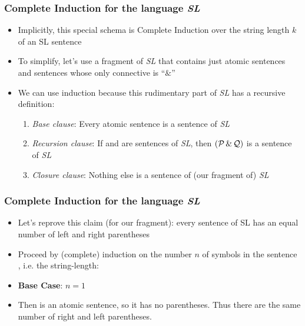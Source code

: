 \begin{frame}
\frametitle{Complete Induction for the language {\it{SL}}}

\begin{itemize}[<+->]
\item Implicitly, this special schema is Complete Induction over the string length $k$ of an SL sentence

\item To simplify, let's use a fragment of {\it{SL}} that contains just atomic sentences and sentences whose only connective is ``$\&$''

\item We can use induction because this rudimentary part of {\it{SL}} has a recursive definition:

\begin{enumerate}
\item {\emph{Base clause}}: Every atomic sentence is a sentence of {\it{SL}}

\item {\emph{Recursion clause}}: If  and  are sentences of {\it{SL}}, then $(\mathcal{P} \,\&\, \mathcal{Q})$ is a sentence of {\it{SL}}

\item {\emph{Closure clause}}: Nothing else is a sentence of (our fragment of) {\it{SL}}
\end{enumerate}

\end{itemize} 
\end{frame}

\begin{frame}
\frametitle{Complete Induction for the language {\it{SL}}}

\begin{itemize}[<+->]

\item Let's reprove this claim (for our fragment): every sentence of SL has an equal number of left and right parentheses

\item Proceed by (complete) induction on the number $n$ of symbols in the sentence , i.e. the string-length:

\item {\bf{Base Case}}: $n=1$

\item[] Then  is an atomic sentence, so it has no parentheses. Thus there are the same number of right and left parentheses.

\end{itemize} 
\end{frame}

